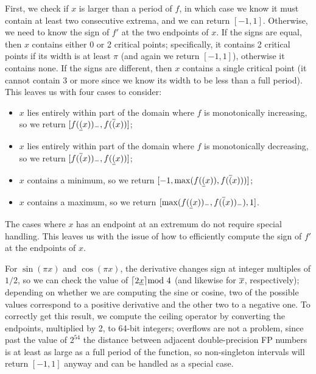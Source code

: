First, we check if $x$ is larger than a period of $f$, in which case we know it must contain at least two consecutive extrema, and we can return $[-1,1]$.
Otherwise, we need to know the sign of $f'$ at the two endpoints of $x$.
If the signs are equal, then $x$ contains either 0 or 2 critical points; specifically, it contains 2 critical points if its width is at least $\pi$ (and again we return $[-1,1]$), otherwise it contains none.
If the signs are different, then $x$ contains a single critical point (it cannot contain 3 or more since we know its width to be less than a full period).
This leaves us with four cases to consider:
\begin{itemize}
	\item $x$ lies entirely within part of the domain where $f$ is monotonically increasing, so we return $[f(\underline{(}x))_-, f(\overline{(}x))]$;
	\item $x$ lies entirely within part of the domain where $f$ is monotonically decreasing, so we return $[f(\overline{(}x))_-, f(\underline{(}x))]$;
	\item $x$ contains a minimum, so we return $[-1, \max(f(\underline{(}x)), f(\overline{(}x)))]$;
	\item $x$ contains a maximum, so we return $[\max(f(\underline{(}x))_-, f(\overline{(}x))_-), 1]$.
\end{itemize}
The cases where $x$ has an endpoint at an extremum do not require special handling.
This leaves us with the issue of how to efficiently compute the sign of $f'$ at the endpoints of $x$.

For $\sin(\pi x)$ and $\cos(\pi x)$, the derivative changes sign at integer multiples of $1/2$, so we can check the value of $\lceil2\underline{x}\rceil\mathrm{mod}\ 4$ (and likewise for $\overline{x}$, respectively); depending on whether we are computing the sine or cosine, two of the possible values correspond to a positive derivative and the other two to a negative one.
To correctly get this result, we compute the ceiling operator by converting the endpoints, multiplied by 2, to 64-bit integers; overflows are not a problem, since past the value of $2^{54}$ the distance between adjacent double-precision FP numbers is at least as large as a full period of the function, so non-singleton intervals will return $[-1,1]$ anyway and can be handled as a special case.

